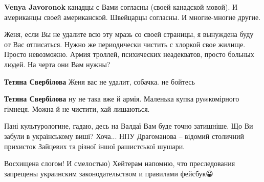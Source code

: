 \begin{itemize}
\begin{itemize}
\textbf{Venya Javoronok} канадцы с Вами согласны (своей канадской мовой). И американцы своей американской. Швейцарцы согласны. И многие-многие другие.
\end{itemize}

 

Женя, если Вы не удалите всю эту мразь со своей страницы, я вынуждена буду от
Вас отписаться. Нужно же периодически чистить с хлоркой свое жилище. Просто
невозможно. Армия троллей, психических неадекватов, просто больных людей. На
черта они Вам нужны?

\begin{itemize}
 
\textbf{Тетяна Свербілова} Женя вас не удалит, собачка. не бойтесь

 
\textbf{Тетяна Свербілова} ну не така вже й армія. Маленька купка руssкомірного гімнеця. Можна й не чистити, хай лишаються.
\end{itemize}

 
Пані культурологине, гадаю, десь на Валдаї Вам буде точно затишніше. Що Ви забули в українському виші? Хоча... НПУ Драгоманова -- відомий столичний прихисток Зайцевих та різної іншої рашистської шушари.

 
Восхищена слогом! И смелостью) Хейтерам напомню, что преследования запрещены украинским законодательством и правилами фейсбук😀

\begin{itemize}
 

\end{itemize}
\end{itemize}
